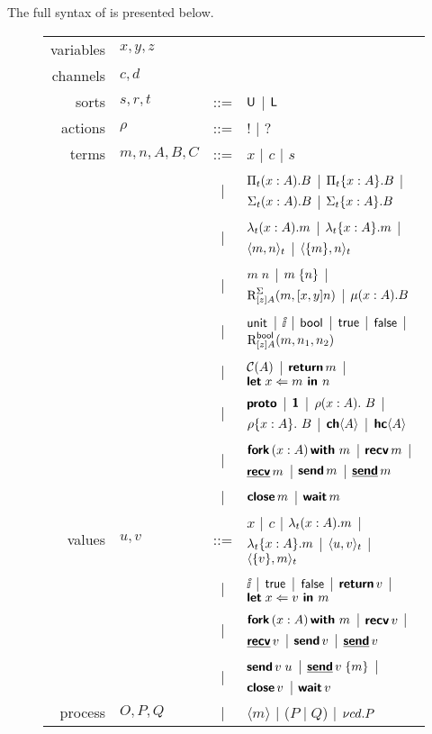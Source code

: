 The full syntax of \TLLC{} is presented below.

\begin{figure}[H]
  \begin{tabular}{r l c l}
    variables & $x, y, z$   &     &                 \\
    channels  & $c, d$      &     &                 \\
    sorts     & $s, r, t$   & ::= & $\textsf{U}$ | $\textsf{L}$   \\
    actions   & $\rho$      & ::= & $!$ | $?$       \\
    terms     & $m,n,A,B,C$ & ::= & $x$ | $c$ | $s$ \\
              &             & \;| & $\Pi_{t}({x : A}).{B}$ | $\Pi_{t}\{{x : A}\}.{B}$
                                    | $\Sigma_{t}({x : A}).{B}$ | $\Sigma_{t}\{{x : A}\}.{B}$ \\
              &             & \;| & $\lambda_{t}({x : A}).{m}$ | $\lambda_{t}\{{x : A}\}.{m}$
                                    | $\langle{{m},{n}}\rangle_{t}$ | $\langle{\{{m}\},{n}}\rangle_{t}$ \\
              &             & \;| & ${m}\;{n}$ | ${m}\;\{{n}\}$ | $\text{R}_{[z]A}^{\Sigma}({m},{[x,y]n})$ | $\mu({x : A}).{B}$ \\
              &             & \;| & $\textsf{unit}$ | $\ii$ | $\textsf{bool}$ | $\textsf{true}$ | $\textsf{false}$
                                    | $\text{R}_{[z]A}^{\textsf{bool}}({m},{n_{1}},{n_{2}})$ \\
              &             & \;| & $\mathcal{C}({A})$ | $\textbf{\textsf{return}}\,{m}$ | $\textbf{\textsf{let}}\;{x}\Leftarrow{m}\textbf{\textsf{ in }}{n}$ \\
              &             & \;| & $\textbf{\textsf{proto}}$ | $\textbf{\textsf{1}}$
                                    | ${{\rho}({x : A}).\ {B}}$ | ${{\rho}\{{x : A}\}.\ {B}}$ | ${\textbf{\textsf{ch}}\langle{A}\rangle}$ | ${\textbf{\textsf{hc}}\langle{A}\rangle}$ \\
              &             & \;| & $\textbf{\textsf{fork}}\,({x : A})\,\textbf{\textsf{with}}\ {m}$ | $\textbf{\textsf{recv}}\,{m}$ | $\underline{\textbf{\textsf{recv}}}\,{m}$
                                    | $\textbf{\textsf{send}}\,{m}$ | $\underline{\textbf{\textsf{send}}}\,{m}$ \\
              &             & \;| & $\textbf{\textsf{close}}\,{m}$ | $\textbf{\textsf{wait}}\,{m}$ \\
    values    & $u, v$      & ::= & $x$ | $c$ | $\lambda_{t}({x : A}).{m}$ | $\lambda_{t}\{{x : A}\}.{m}$
                                    | $\langle{{u},{v}}\rangle_{t}$ | $\langle{\{{v}\},{m}}\rangle_{t}$ \\
              &             & \;| & $\ii$ | $\textsf{true}$ | $\textsf{false}$ | $\textbf{\textsf{return}}\,{v}$ | $\textbf{\textsf{let}}\;{x}\Leftarrow{v}\textbf{\textsf{ in }}{m}$ \\
              &             & \;| & $\textbf{\textsf{fork}}\,({x : A})\,\textbf{\textsf{with}}\ {m}$ | $\textbf{\textsf{recv}}\,{v}$ | $\underline{\textbf{\textsf{recv}}}\,{v}$ | $\textbf{\textsf{send}}\,{v}$ | $\underline{\textbf{\textsf{send}}}\,{v}$ \\
              &             & \;| & ${\textbf{\textsf{send}}\,{v}}\;{u}$ | ${\underline{\textbf{\textsf{send}}}\,{v}}\;\{{m}\}$ | $\textbf{\textsf{close}}\,{v}$ | $\textbf{\textsf{wait}}\,{v}$ \\
    process   & $O, P, Q$   & \;| & $\langle m \rangle$ | ($P \mid Q$) | ${\nu{cd}.{P}}$
  \end{tabular}
\end{figure}

